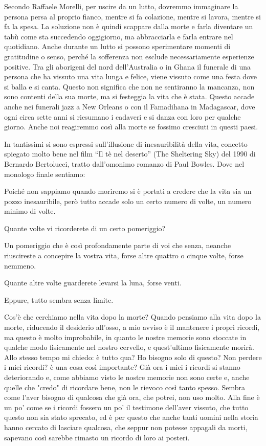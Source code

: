 \documentclass[12pt]{book} %
\begin{document}
Secondo Raffaele Morelli, per uscire da un lutto, dovremmo immaginare la persona persa al proprio fianco, mentre si fa
colazione, mentre si lavora, mentre si fa la spesa. La soluzione non è quindi scappare dalla morte e farla diventare un
tabù come sta succedendo oggigiorno, ma abbracciarla e farla entrare nel quotidiano. Anche durante un lutto si possono sperimentare momenti di gratitudine o senso, perché la sofferenza non esclude necessariamente esperienze positive.
Tra gli aborigeni del nord dell'Australia o in Ghana il funerale di una persona che ha vissuto una vita lunga e felice, viene
vissuto come una festa dove si balla e si canta. Questo non significa che non ne sentiranno la mancanza, non sono
contenti della sua morte, ma si festeggia la vita che è stata. Questo accade anche nei funerali jazz a New Orleans o
con il Famadihana in Madagascar, dove ogni circa sette anni si riesumano i cadaveri e si danza con loro per qualche
giorno. Anche noi reagiremmo così alla morte se fossimo cresciuti in questi paesi.

In tantissimi si sono espressi sull'illusione di inesauribilità della vita, concetto spiegato molto
bene nel film “Il tè nel deserto” (The Sheltering Sky) del 1990 di Bernardo Bertolucci, tratto dall'omonimo romanzo di
Paul Bowles. Dove nel monologo finale sentiamo:

Poiché non sappiamo quando moriremo si è portati a credere che la vita sia un pozzo inesauribile, però tutto accade solo
un certo numero di volte, un numero minimo di volte.

Quante volte vi ricorderete di un certo pomeriggio?

Un pomeriggio che è così profondamente parte di voi che senza, neanche riuscireste a concepire la vostra vita, forse
altre quattro o cinque volte, forse nemmeno.

Quante altre volte guarderete levarsi la luna, forse venti.

Eppure, tutto sembra senza limite.

Cos'è che cerchiamo nella vita dopo la morte? Quando pensiamo alla vita dopo la morte, riducendo il desiderio all'osso, a mio avviso è il mantenere i propri ricordi, ma questo è molto improbabile, in quanto le nostre memorie sono stoccate in qualche modo fisicamente nel nostro cervello, e quest'ultimo fisicamente morirà. Allo stesso tempo mi chiedo: è tutto qua? Ho bisogno solo di questo? Non perdere i miei ricordi? è una cosa così importante? Già ora i miei i ricordi si stanno deteriorando e, come abbiamo visto le nostre memorie non sono certe e, anche quelle che "credo" di ricordare bene, non le rievoco così tanto spesso. Sembra come l'aver bisogno di qualcosa che già  ora, che potrei, non uso molto. Alla fine è un po' come se i ricordi fossero un po' il testimone dell'aver vissuto, che tutto questo non sia stato sprecato, ed è per questo che anche tanti uomini nella storia hanno cercato di lasciare qualcosa, che seppur non potesse appagali da morti, sapevano così sarebbe rimasto un ricordo di loro ai posteri.
\end{document}
